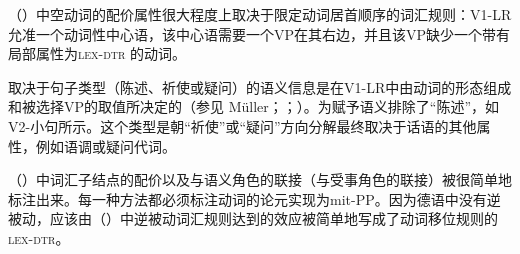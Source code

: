 \begin{exe}
\begin{xlist}[iv.]
\begin{exe}
\begin{xlist}[iv.]
{{{{{{{                                                  }\\
                                                 }\\
                                      }\\
                          }\\
}\\
}}
\z
%
（）中空动词的配价属性很大程度上取决于限定动词居首顺序的词汇规则：V1-LR允准一个动词性中心语，该中心语需要一个VP在其右边，并且该VP缺少一个带有局部属性为\textsc{lex-dtr} 的动词。

取决于句子类型（陈述、祈使或疑问）的语义信息是在V1-LR中由动词的形态组成和被选择VP的\slashv 取值所决定的（参见 Müller\citeyear[\S~10.3]{MuellerLehrbuch1}；\citeyear{MuellerSatztypen}；\citeyear{MuellerGS}）。为赋予语义排除了“陈述”，如V2-小句所示。这个类型是朝“祈使”或“疑问”方向分解最终取决于话语的其他属性，例如语调或疑问代词。

（）中词汇子结点的配价以及与语义角色的联接（与受事角色的联接）被很简单地标注出来。每一种方法都必须标注动词的论元实现为mit-PP。因为德语中没有逆被动，应该由（）中逆被动词汇规则达到的效应被简单地写成了动词移位规则的\textsc{lex-dtr}。


\end{xlist}
\end{exe}
\end{xlist}
\end{exe}
